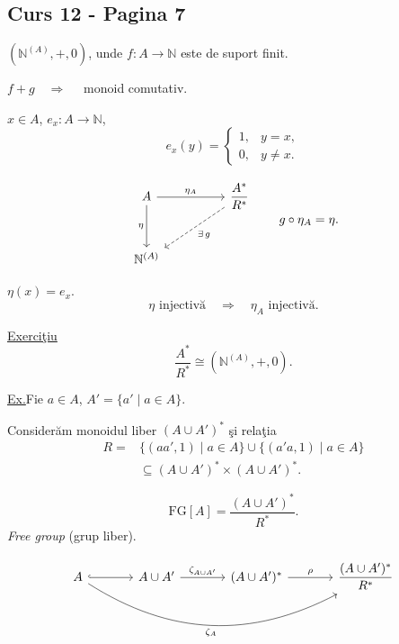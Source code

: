 
\subsection*{Curs 12 - Pagina 7}

\noindent $(\mathbb{N}^{(A)},+,0)$, unde
$f:A\longrightarrow\mathbb{N}$ este de suport finit.

\medskip
\noindent $f+g\quad\Longrightarrow\quad$ monoid comutativ.

\bigskip
\noindent $x\in A$, \quad $e_x:A\longrightarrow\mathbb{N}$,
\[
e_x(y)=
\begin{cases}
1, & y=x,\\
0, & y\neq x.
\end{cases}
\]

\[
\begin{tikzcd}[column sep=huge, row sep=large]
A \arrow[r,"\eta_A"] \arrow[d,"\eta"']
  & \dfrac{A^*}{R^*} \arrow[dl,dashed,"{\exists\,g}"]\\
\mathbb{N}^{(A)} &
\end{tikzcd}
\qquad g\circ\eta_A=\eta.
\]

\noindent $\eta(x)=e_x$.
\[
\eta\text{ injectiv\u{a}}\quad\Longrightarrow\quad
\eta_A\text{ injectiv\u{a}}.
\]

\medskip
\noindent\underline{Exerci\c{t}iu}
\[
\frac{A^*}{R^*}\cong(\mathbb{N}^{(A)},+,0).
\]

\bigskip
\noindent\underline{Ex.}\quad Fie $a\in A$, 
$A'=\{a'\mid a\in A\}$.

\medskip
\noindent Consider\u{a}m monoidul liber $(A\cup A')^*$
\c{s}i rela\c{t}ia
\[
\begin{aligned}
R={}&\{(aa',1)\mid a\in A\}
  \cup\{(a'a,1)\mid a\in A\}\\
&\subseteq (A\cup A')^*\times(A\cup A')^*.
\end{aligned}
\]

\[
\mathrm{FG}[A]=\frac{(A\cup A')^*}{R^*}.
\]
\noindent\textit{Free group} (grup liber).

\medskip
\[
\begin{tikzcd}[column sep=large, row sep=large]
A \arrow[r,hook] \arrow[rrr,bend right=30,"\zeta_A"']
& A\cup A' \arrow[r,"\zeta_{A\cup A'}"]
& (A\cup A')^* \arrow[r,"\rho"]
& \dfrac{(A\cup A')^*}{R^*}
\end{tikzcd}
\]
